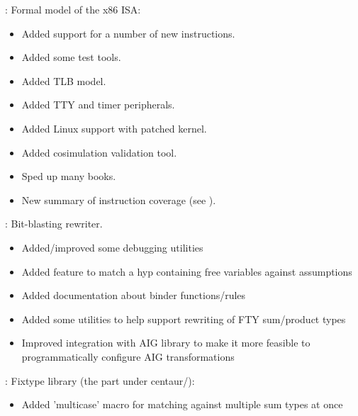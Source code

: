 
\begin{frame}

\implibtitle

:
Formal model of the x86 ISA:
\begin{itemize}
\item Added support for a number of new instructions.
\item Added some test tools.
\item Added TLB model.
\item Added TTY and timer peripherals.
\item Added Linux support with patched kernel.
\item Added cosimulation validation tool.
\item Sped up many books.
\item New summary of instruction coverage (see ).
\end{itemize}

\end{frame}


\begin{frame}

\implibtitle

:
Bit-blasting rewriter.
\begin{itemize}
\item Added/improved some debugging utilities
\item Added feature to match a hyp containing free variables against assumptions
\item Added documentation about binder functions/rules
\item Added some utilities to help support rewriting of FTY sum/product types
\item Improved integration with AIG library to make it more feasible
  to programmatically configure AIG transformations
\end{itemize}

\end{frame}



\begin{frame}

\implibtitle

:
Fixtype library (the part under centaur/):
\begin{itemize}
\item Added 'multicase' macro for matching against multiple sum types at once
\end{itemize}

\end{frame}

